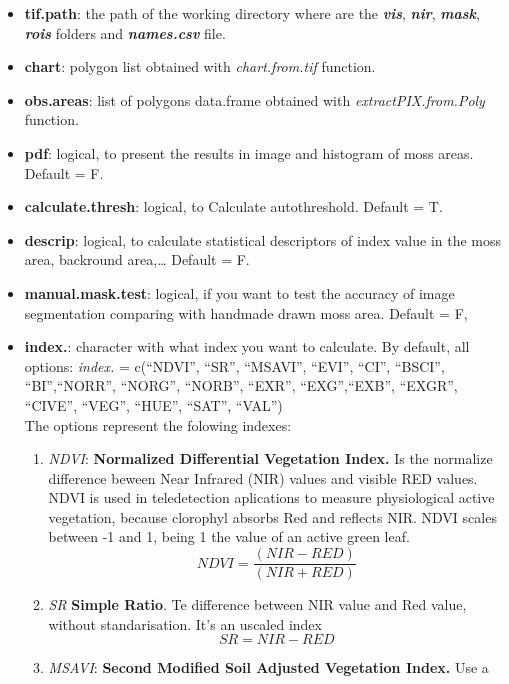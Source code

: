 \documentclass[
]{article}
\providecommand{\tightlist}{%
  \setlength{\itemsep}{0pt}\setlength{\parskip}{0pt}}
\begin{document}
\begin{itemize}
\tightlist
\item
  \textbf{tif.path}: the path of the working directory where are the
  \emph{\textbf{vis}}, \emph{\textbf{nir}}, \emph{\textbf{mask}},
  \emph{\textbf{rois}} folders and \emph{\textbf{names.csv}} file.
\item
  \textbf{chart}: polygon list obtained with \emph{chart.from.tif}
  function.
\item
  \textbf{obs.areas}: list of polygons data.frame obtained with
  \emph{extractPIX.from.Poly} function.
\item
  \textbf{pdf}: logical, to present the results in image and histogram
  of moss areas. Default = F.
\item
  \textbf{calculate.thresh}: logical, to Calculate autothreshold.
  Default = T.
\item
  \textbf{descrip}: logical, to calculate statistical descriptors of
  index value in the moss area, backround area,\ldots{} Default = F.
\item
  \textbf{manual.mask.test}: logical, if you want to test the accuracy
  of image segmentation comparing with handmade drawn moss area. Default
  = F,
\item
  \textbf{index.}: character with what index you want to calculate. By
  default, all options: \emph{index.} = c(``NDVI'', ``SR'', ``MSAVI'',
  ``EVI'', ``CI'', ``BSCI'', ``BI'',``NORR'', ``NORG'', ``NORB'',
  ``EXR'', ``EXG'',``EXB'', ``EXGR'', ``CIVE'', ``VEG'', ``HUE'',
  ``SAT'', ``VAL'')
  \bigskip
  \\
  The options represent the folowing indexes:
  \medskip 
   \begin{enumerate}
    	\item \emph{NDVI}: \textbf{Normalized Differential Vegetation Index.}
    	Is the normalize difference beween Near Infrared (NIR) values and visible RED values. 
    	NDVI is used in teledetection aplications to measure physiological active vegetation, 
    	because clorophyl absorbs Red and reflects NIR. NDVI scales between -1 and 1, being 1 
    	the value of an active green leaf.   
    	\[
    	NDVI = \frac{(NIR - RED)}{(NIR + RED)}  
    	\]
        \item \emph{SR} \textbf{Simple Ratio}. Te difference between NIR value and Red value, 
        without standarisation. It's an uscaled index
        \[
    	SR = NIR - RED
    	\] 
        \item \emph{MSAVI}:  \textbf{Second Modified Soil Adjusted Vegetation Index.} Use a 

\end{enumerate}
\end{itemize}
\end{document}
